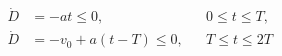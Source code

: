 \documentclass[border=2.5pt]{standalone}
\begin{document}
$\displaystyle \begin{aligned} \dot D&=-at\le0,&&0\le t\le T,\\ \dot D&=-v_0+a(t-T)\le0,&&T\le t\le2T \end{aligned}$
\end{document}
